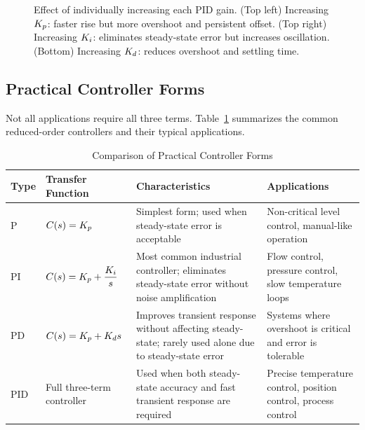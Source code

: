 \begin{figure}[htbp]
\begin{subfigure}[b]{0.48\textwidth}
\end{subfigure}
\caption{Effect of individually increasing each PID gain. (Top left) Increasing $K_p$: faster rise but more overshoot and persistent offset. (Top right) Increasing $K_i$: eliminates steady-state error but increases oscillation. (Bottom) Increasing $K_d$: reduces overshoot and settling time.}
\label{fig:gain_effects}
\end{figure}

\subsection{Practical Controller Forms}

Not all applications require all three terms. Table~\ref{tab:controller_forms} summarizes the common reduced-order controllers and their typical applications.

\begin{table}[htbp]
\centering
\caption{Comparison of Practical Controller Forms}
\label{tab:controller_forms}
\begin{tabular}{lp{4cm}p{4.5cm}p{4cm}}
\toprule
\textbf{Type} & \textbf{Transfer Function} & \textbf{Characteristics} & \textbf{Applications} \\
\midrule
P & $C(s) = K_p$ & Simplest form; used when steady-state error is acceptable & Non-critical level control, manual-like operation \\
\addlinespace
PI & $C(s) = K_p + \dfrac{K_i}{s}$ & Most common industrial controller; eliminates steady-state error without noise amplification & Flow control, pressure control, slow temperature loops \\
\addlinespace
PD & $C(s) = K_p + K_d s$ & Improves transient response without affecting steady-state; rarely used alone due to steady-state error & Systems where overshoot is critical and error is tolerable \\
\addlinespace
PID & Full three-term controller & Used when both steady-state accuracy and fast transient response are required & Precise temperature control, position control, process control \\
\bottomrule
\end{tabular}
\end{table}


